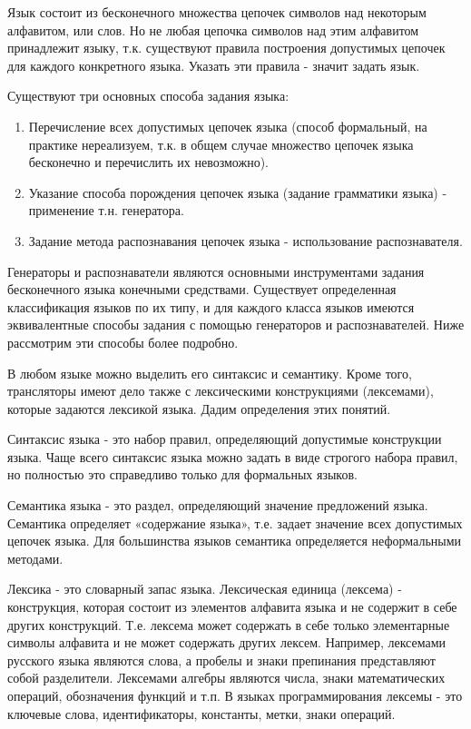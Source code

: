 Язык состоит из бесконечного множества цепочек символов над некоторым алфавитом, или слов. Но не любая цепочка символов над этим алфавитом принадлежит языку, т.к. существуют правила построения допустимых цепочек для каждого конкретного языка. Указать эти правила - значит задать язык. 

Существуют три основных способа задания языка:

\begin{enumerate}
  \item Перечисление всех допустимых цепочек языка (способ формальный, на практике нереализуем, т.к. в общем случае множество цепочек языка бесконечно и перечислить их невозможно).
  \item Указание способа порождения цепочек языка (задание грамматики языка) - применение т.н. генератора.
  \item Задание метода распознавания цепочек языка - использование распознавателя.
\end{enumerate}

Генераторы и распознаватели являются основными инструментами задания бесконечного языка конечными средствами. Существует определенная классификация языков по их типу, и для каждого класса языков имеются эквивалентные способы задания с помощью генераторов и распознавателей. Ниже рассмотрим эти способы более подробно.

В любом языке можно выделить его синтаксис и семантику. Кроме того, трансляторы имеют дело также с лексическими конструкциями (лексемами), которые задаются лексикой языка. Дадим определения этих понятий.

\begin{opr}
  Синтаксис языка - это набор правил, определяющий допустимые конструкции языка. Чаще всего синтаксис языка можно задать в виде строгого набора правил, но полностью это справедливо только для формальных языков.
\end{opr}

\begin{opr}
  Семантика языка - это раздел, определяющий значение предложений языка. Семантика определяет «содержание языка», т.е. задает значение всех допустимых цепочек языка. Для большинства языков семантика определяется неформальными методами.
\end{opr}

Лексика - это словарный запас языка. Лексическая единица (лексема) - конструкция, которая состоит из элементов алфавита языка и не содержит в себе других конструкций. Т.е. лексема может содержать в себе только элементарные символы алфавита и не может содержать других лексем. Например, лексемами русского языка являются слова, а пробелы и знаки препинания представляют собой разделители. Лексемами алгебры являются числа, знаки математических операций, обозначения функций и т.п. В языках программирования лексемы - это ключевые слова, идентификаторы, константы, метки, знаки операций.

